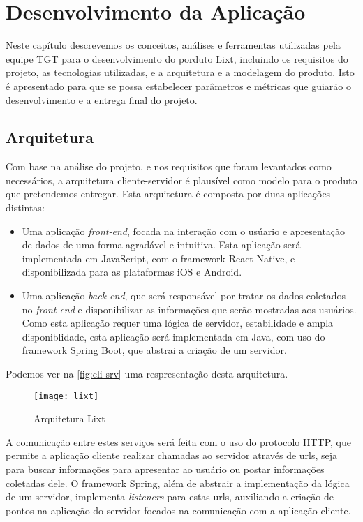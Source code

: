 \chapter{Desenvolvimento da Aplicação}

Neste capítulo descrevemos os conceitos, análises e ferramentas
utilizadas pela equipe TGT para o desenvolvimento do porduto Lixt,
incluindo os requisitos do projeto, as tecnologias utilizadas, e a
arquitetura e a modelagem do produto.
Isto é apresentado para que se possa estabelecer parâmetros e métricas
que guiarão o desenvolvimento e a entrega final do projeto.

\section{Arquitetura}
Com base na análise do projeto, e nos requisitos que foram levantados
como necessários, a arquitetura cliente-servidor é plausível como
modelo para o produto que pretendemos entregar.
Esta arquitetura é composta por duas aplicações distintas:
\begin{itemize}
\item Uma aplicação \emph{front-end}, focada na interação com o usúario
  e apresentação de dados de uma forma agradável e intuitiva. Esta
  aplicação será implementada em JavaScript, com o framework React
  Native, e disponibilizada para as plataformas iOS e Android.
\item Uma aplicação \emph{back-end}, que será responsável por tratar os
  dados coletados no \emph{front-end} e disponibilizar as informações
  que serão mostradas aos usuários. Como esta aplicação requer uma
  lógica de servidor, estabilidade e ampla disponiblidade, esta
  aplicação será implementada em Java, com uso do framework Spring
  Boot, que abstrai a criação de um servidor.
\end{itemize}
Podemos ver na \autoref{fig:cli-srv} uma respresentação desta
arquitetura.

\begin{figure}
  \centering
  \texttt{[image: lixt]}
  \caption{Arquitetura Lixt}
  \label{fig:cli-srv}
\end{figure}

A comunicação entre estes serviços será feita com o uso do protocolo
\label{sig:http}HTTP, que permite a aplicação cliente realizar chamadas ao servidor
através de urls, seja para buscar informações para apresentar ao
usuário ou postar informações coletadas dele. O framework Spring, além
de abstrair a implementação da lógica de um servidor, implementa
\emph{listeners} para estas urls, auxiliando a criação de pontos na
aplicação do servidor focados na comunicação com a aplicação cliente.

